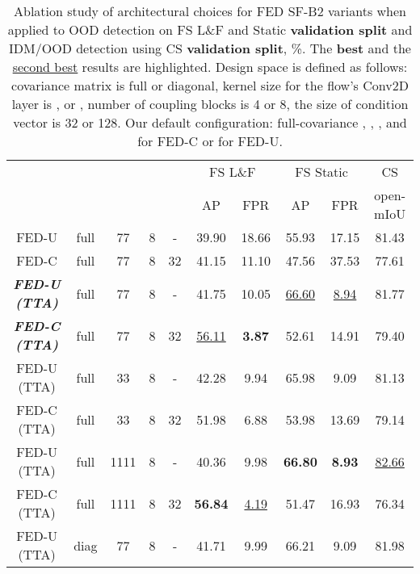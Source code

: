 \documentclass[accepted, startpage]{uai2023}
\newcommand{\textun}[1]{\underline{#1}}
\begin{document}
\begin{table*}[ht]
	\caption{Ablation study of architectural choices for FED SF-B2 variants when applied to OOD detection on FS L\&F and Static \textbf{validation split} and IDM/OOD detection using CS \textbf{validation split}, \%. The \textbf{best} and the \textun{second best} results are highlighted. Design space is defined as follows: covariance matrix  is full or diagonal, kernel size  for the flow's Conv2D layer is ,  or , number of coupling blocks  is 4 or 8, the size  of condition vector  is 32 or 128. Our default configuration: full-covariance , , , and  for FED-C or  for FED-U.}
	\label{tab:ablation-results}
	\centering
	\small
	\begin{tabular}{c|c|c|c|c|cc|cc|c}
		\toprule
		\multirow{2}{*}{\shortstack{Method}} & \multirow{2}{*}{\shortstack{}} & \multirow{2}{*}{\shortstack{}} & \multirow{2}{*}{\shortstack{}} & \multirow{2}{*}{\shortstack{}} & \multicolumn{2}{|c}{FS L\&F} & \multicolumn{2}{|c|}{FS Static} & CS \\
		&  &  &  &  & AP & FPR & AP & FPR & open-mIoU \\
		\midrule
		FED-U       & full & 77  & 8 &  -  &          39.90 &          18.66 &          55.93 &         17.15  &         81.43 \\
		FED-C       & full & 77  & 8 &  32 &          41.15 &          11.10 &          47.56 &         37.53  &         77.61 \\
		\textbf{\textit{FED-U (TTA)}} & full & 77  & 8 &  -  &          41.75 &          10.05 & \textun{66.60} &  \textun{8.94} &         81.77 \\
		\textbf{\textit{FED-C (TTA)}} & full & 77  & 8 &  32 & \textun{56.11} &  \textbf{3.87} &          52.61 &         14.91  &         79.40 \\
		FED-U (TTA) & full & 33  & 8 &  -  &          42.28 &           9.94 &          65.98 &          9.09  &         81.13 \\
		FED-C (TTA) & full & 33  & 8 &  32 &          51.98 &           6.88 &          53.98 &         13.69  &         79.14 \\
		FED-U (TTA) & full & 1111 & 8 &  -  &          40.36 &           9.98 & \textbf{66.80} &  \textbf{8.93} & \textun{82.66} \\
		FED-C (TTA) & full & 1111 & 8 &  32 & \textbf{56.84} &  \textun{4.19} &          51.47 &         16.93  &         76.34 \\
		FED-U (TTA) & diag & 77  & 8 &  -  &          41.71 &           9.99 &          66.21 &          9.09  &         81.98 \\

\end{tabular}
\end{table*}
\end{document}

